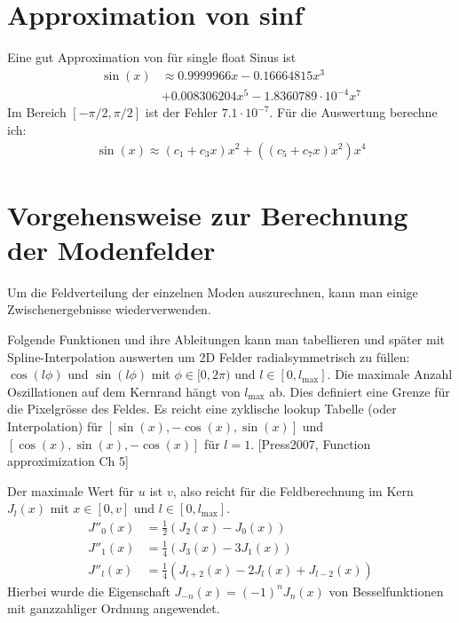 \documentclass[DIV19,twocolumn]{scrartcl}
\def\({\left(}
\def\){\right)}
\newcommand{\lmax}{l_\textrm{max}}
\begin{document}
\section{Approximation von sinf}
Eine gut Approximation von f\"ur single float Sinus ist
\begin{align}
  \sin(x)&\approx 0.9999966 x -0.16664815 x^3 \nonumber\\
  &+0.008306204 x^5 -1.8360789\cdot 10^{-4} x^7 
\end{align}
Im Bereich $[-\pi/2,\pi/2]$ ist der Fehler $7.1\cdot 10^{-7}$.
F\"ur die Auswertung berechne ich:
\begin{align}
  \sin(x) \approx (c_1 + c_3 x) x^2 + ( (c_5 +c_7 x)x^2) x^4
\end{align}


\section{Vorgehensweise zur Berechnung der Modenfelder}
Um die Feldverteilung der einzelnen Moden auszurechnen, kann man
einige Zwischenergebnisse wiederverwenden.

Folgende Funktionen und ihre Ableitungen kann man tabellieren und
sp\"ater mit Spline-Interpolation auswerten um 2D Felder
radialsymmetrisch zu f\"ullen: $\cos(l\phi)$ und $\sin(l\phi)$ mit
$\phi\in[0,2\pi)$ und $l\in[0,\lmax]$. Die maximale Anzahl
Oszillationen auf dem Kernrand h\"angt von $\lmax$ ab. Dies definiert
eine Grenze f\"ur die Pixelgr\"osse des Feldes. Es reicht eine
zyklische lookup Tabelle (oder Interpolation) f\"ur
$[\sin(x),-\cos(x),\sin(x)]$ und $[\cos(x),\sin(x),-\cos(x)]$ f\"ur $l=1$.
[Press2007, Function approximization Ch 5]


Der maximale Wert f\"ur $u$ ist $v$, also reicht f\"ur die
Feldberechnung im Kern $J_l(x)$ mit
$x\in[0,v]$ und $l\in[0,\lmax]$. 
\begin{align}
  J''_0(x) &= \frac{1}{2}\(J_2(x)-J_0(x)\)\\
  J''_1(x) &= \frac{1}{4}\(J_3(x)-3J_1(x)\)\\
  J''_l(x) &= \frac{1}{4}\(J_{l+2}(x)-2J_l(x)+J_{l-2}(x)\)
\end{align}
Hierbei wurde die Eigenschaft $J_{-n}(x) = (-1)^n J_n(x)$ von
Besselfunktionen mit ganzzahliger Ordnung angewendet.
\end{document}
